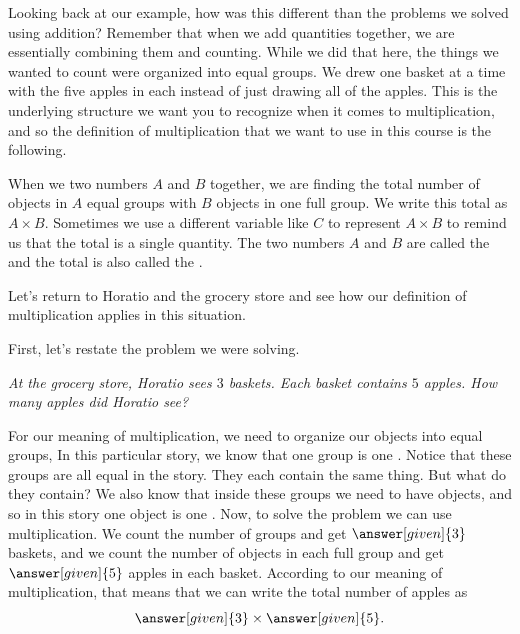 \documentclass{ximera}
\begin{document}
Looking back at our example, how was this different than the problems we solved using addition? Remember that when we add quantities together, we are essentially combining them and counting. While we did that here, the things we wanted to count were organized into equal groups. We drew one basket at a time with the five apples in each instead of just drawing all of the apples. This is the underlying structure we want you to recognize when it comes to multiplication, and so the definition of multiplication that we want to use in this course is the following.

\begin{definition}
When we  two numbers $A$ and $B$ together, we are finding the total number of objects in $A$ equal groups with $B$ objects in one full group. We write this total as $A\times B$. Sometimes we use a different variable like $C$ to represent $A\times B$ to remind us that the total is a single quantity. The two numbers $A$ and $B$ are called the  and the total is also called the .
\begin{image}
\end{image}
\end{definition}

Let's return to Horatio and the grocery store and see how our definition of multiplication applies in this situation.
\begin{explanation}
First, let's restate the problem we were solving. 

\emph{At the grocery store, Horatio sees $3$ baskets. Each basket contains $5$ apples. How many apples did Horatio see?}

For our meaning of multiplication, we need to organize our objects into equal groups, In this particular story, we know that one group is one . Notice that these groups are all equal in the story. They each contain the same thing. But what do they contain? We also know that inside these groups we need to have objects, and so in this story one object is one  . Now, to solve the problem we can use multiplication. We count the number of groups and get $\answer[given]{3}$ baskets, and we count the number of objects in each full group and get $\answer[given]{5}$ apples in each basket. According to our meaning of multiplication, that means that we can write the total number of apples as 
\[
\answer[given]{3} \times \answer[given]{5}.
\]
\end{explanation}
\end{document}
